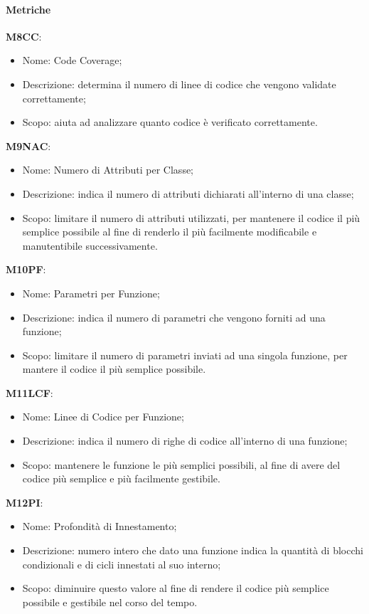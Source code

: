     \paragraph{Metriche}\hfill \break
    \textbf{M8CC}:
    \begin{itemize}
      \item Nome: Code Coverage;
      \item Descrizione: determina il numero di linee di codice che vengono validate correttamente;
      \item Scopo: aiuta ad analizzare quanto codice è verificato correttamente.
    \end{itemize}
    \textbf{M9NAC}:
    \begin{itemize}
      \item Nome: Numero di Attributi per Classe;
      \item Descrizione: indica il numero di attributi dichiarati all'interno di una classe;
      \item Scopo: limitare il numero di attributi utilizzati, per mantenere il codice il più semplice possibile al fine di renderlo il più facilmente modificabile e manutentibile successivamente.
    \end{itemize} 
    \textbf{M10PF}:
    \begin{itemize}
      \item Nome: Parametri per Funzione;
      \item Descrizione: indica il numero di parametri che vengono forniti ad una funzione;
      \item Scopo: limitare il numero di parametri inviati ad una singola funzione, per mantere il codice il più semplice possibile.
    \end{itemize}
    \textbf{M11LCF}:
    \begin{itemize}
      \item Nome: Linee di Codice per Funzione;
      \item Descrizione: indica il numero di righe di codice all'interno di una funzione;
      \item Scopo: mantenere le funzione le più semplici possibili, al fine di avere del codice più semplice e più facilmente gestibile.
    \end{itemize}    
    \textbf{M12PI}:
    \begin{itemize}
      \item Nome: Profondità di Innestamento;
      \item Descrizione: numero intero che dato una funzione indica la quantità di blocchi condizionali e di cicli innestati al suo interno;
      \item Scopo: diminuire questo valore al fine di rendere il codice più semplice possibile e gestibile nel corso del tempo.
    \end{itemize}
